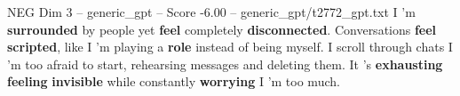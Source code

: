 \begin{textsample}{NEG Dim 3 – generic\_gpt – Score -6.00 – generic\_gpt/t2772\_gpt.txt}  \label{ex:f3_neg_010}
I ’m \textbf{surrounded} by people yet \textbf{feel} completely \textbf{disconnected}.
Conversations \textbf{feel} \textbf{scripted}, like I ’m playing a \textbf{role} instead of being myself.
I scroll through chats I ’m too afraid to start, rehearsing messages and deleting them.
It ’s \textbf{exhausting} \textbf{feeling} \textbf{invisible} while constantly \textbf{worrying} I ’m too much.

\end{textsample}
